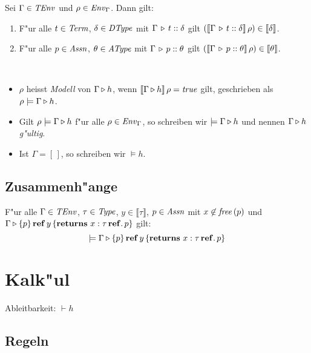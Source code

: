 \documentclass[12pt,a4paper,bigheadings]{scrartcl}
\newcommand{\semantic}[1]{\ensuremath{\llbracket#1\rrbracket}}
\newcommand{\TEnv}{\name{TEnv}}
\newcommand{\Dtype}{\name{DType}}
\newcommand{\Atype}{\name{AType}}
\newcommand{\Assn}{\name{Assn}}
\newcommand{\Term}{\name{Term}}
\begin{document}
\begin{satz}
  Sei $\Gamma \in \TEnv$ und $\rho \in {\text{\it Env\/}}_\Gamma$. Dann gilt:
  \begin{enumerate}
    \item F"ur alle $t \in \Term$, $\delta \in \Dtype$ mit $\Gamma \, \triangleright \, t\mathrel{::}\delta$ gilt
          $(\semantic{\Tj{\Gamma}{t}{\delta}}\,\rho)\in\semantic{\delta}$.
    \item F"ur alle $p \in \Assn$, $\theta \in \Atype$ mit $\Gamma \, \triangleright \, p\mathrel{::}\theta$ gilt
          $(\semantic{\Tj{\Gamma}{p}{\theta}}\,\rho)\in\semantic{\theta}$.
  \end{enumerate}
\end{satz}

\begin{beweis}
\end{beweis}

\begin{definition}[Modell] \
  \begin{itemize}
    \item $\rho$ heisst {\em Modell} von $\Gamma \triangleright h$, wenn $\semantic{\Tjh{\Gamma}{h}}\,\rho = \true$
          gilt, geschrieben als $\rho \models \Gamma \triangleright h$.
    \item Gilt $\rho \models \Gamma \triangleright h$ f"ur alle $\rho\in{\text{\it Env\/}}_\Gamma$, so schreiben wir
          $\models \Gamma \triangleright h$ und nennen  $\Gamma \triangleright h$ {\em g"ultig}.
    \item Ist $\Gamma = [\,]$, so schreiben wir $\models h$.
  \end{itemize}
\end{definition}


\subsection{Zusammenh"ange}

\begin{lemma}
  F"ur alle $\Gamma\in\TEnv$, $\tau\in{\text{\it Type\/}}$, $y\in\semantic{\tau}$, $p \in\Assn$ mit
  $x \not \in {\text{\it free\/}}\,(p)$ und $\Gamma \triangleright \{p\}\,\mathbf{ref}\,y\,\{{\bf returns}\ x:\tau\,\mathbf{ref}.\, p\}$ gilt:
  \[
    \models \Gamma \triangleright \{p\}\,\mathbf{ref}\,y\,\{{\bf returns}\ x:\tau\,\mathbf{ref}.\, p\}
  \]
\end{lemma}



\section{Kalk"ul}

Ableitbarkeit: $\vdash h$

\subsection{Regeln}
\end{document}

